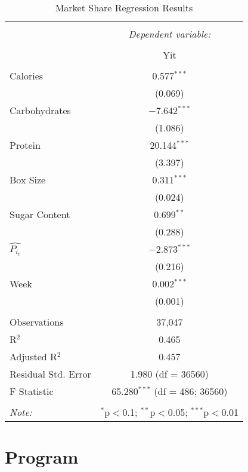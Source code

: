 \documentclass[12pt,english]{article}
\begin{document}
\begin{table}\centering 
  \caption{Market Share Regression Results} 
  \label{} 
\begin{tabular}{@{\extracolsep{5pt}}lc} 
\\[-1.8ex]\hline 
\hline \\[-1.8ex] 
 & \multicolumn{1}{c}{\textit{Dependent variable:}} \\ 
\cline{2-2} 
\\[-1.8ex] & Yit \\ 
\hline \\[-1.8ex] 
 Calories & 0.577$^{***}$ \\ 
  & (0.069) \\ 
 Carbohydrates & $-$7.642$^{***}$ \\ 
  & (1.086) \\ 
 Protein & 20.144$^{***}$ \\ 
  & (3.397) \\ 
 Box Size & 0.311$^{***}$ \\ 
  & (0.024) \\ 
 Sugar Content & 0.699$^{**}$ \\ 
  & (0.288) \\ 
$\widehat{P_i_t }$ & $-$2.873$^{***}$ \\ 
  & (0.216) \\ 
 Week & 0.002$^{***}$ \\ 
  & (0.001) \\ 
\hline \\[-1.8ex] 
Observations & 37,047 \\ 
R$^{2}$ & 0.465 \\ 
Adjusted R$^{2}$ & 0.457 \\ 
Residual Std. Error & 1.980 (df = 36560) \\ 
F Statistic & 65.280$^{***}$ (df = 486; 36560) \\ 
\hline 
\hline \\[-1.8ex] 
\textit{Note:}  & \multicolumn{1}{r}{$^{*}$p$<$0.1; $^{**}$p$<$0.05; $^{***}$p$<$0.01} \\ 
\end{tabular} 
\end{table}

\section{Program}
\end{document}
